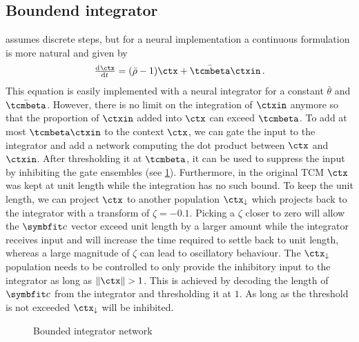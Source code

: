 \subsection{Boundend integrator}
 assumes discrete steps, but for a neural implementation a continuous formulation is more natural and given by
\begin{equation}
    \od{\ctx}{t} = (\bar{\rho} - 1) \ctx + \bar{\tcmbeta} \ctxin\,\text{.}
\end{equation}
This equation is easily implemented with a neural integrator for a constant $\bar{\theta}$ and $\bar{\tcmbeta}$.
However, there is no limit on the integration of $\ctxin$ anymore so that the proportion of $\ctxin$ added into $\ctx$ can exceed $\tcmbeta$.
To add at most $\tcmbeta \ctxin$ to the context $\ctx$, we can gate the input to the integrator and add a network computing the dot product between $\ctx$ and $\ctxin$.
After thresholding it at $\tcmbeta$, it can be used to suppress the input by inhibiting the gate ensembles (see \cref{fig:ctx-bounded-integrator}).
Furthermore, in the original TCM $\ctx$ was kept at unit length while the integration has no such bound.
To keep the unit length, we can project $\ctx$ to another population $\ctx_{\downarrow}$ which projects back to the integrator with a transform of $\zeta = -0.1$.
Picking a $\zeta$ closer to zero will allow the $\vc c$ vector exceed unit length by a larger amount while the integrator receives input and will increase the time required to settle back to unit length, whereas a large magnitude of $\zeta$ can lead to oscillatory behaviour.
The $\ctx_{\downarrow}$ population needs to be controlled to only provide the inhibitory input to the integrator as long as $\lVert\ctx\rVert > 1$.
This is achieved by decoding the length of $\vc c$ from the integrator and thresholding it at $1$.
As long as the threshold is not exceeded $\ctx_{\downarrow}$ will be inhibited.
\begin{figure}
    \centering
    \caption{Bounded integrator network}\label{fig:ctx-bounded-integrator}
\end{figure}


